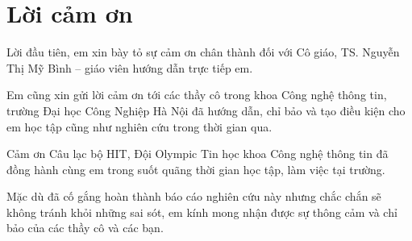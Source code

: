 \documentclass[envcountsame,envcountchap, openany, 14pt]{mysvmono2}
\begin{document}
\frontmatter%
\mainmatter%


\section*{\centering Lời cảm ơn}

Lời đầu tiên, em xin bày tỏ sự cảm ơn chân thành đối với Cô giáo, TS.
Nguyễn Thị Mỹ Bình – giáo viên hướng dẫn trực tiếp em.

Em cũng xin gửi lời cảm ơn tới các thầy cô trong khoa Công nghệ thông tin,
trường Đại học Công Nghiệp Hà Nội đã hướng dẫn, chỉ bảo và tạo điều kiện cho em
học tập cũng như nghiên cứu trong thời gian qua.

Cảm ơn Câu lạc bộ HIT, Đội Olympic Tin học khoa Công nghệ thông tin đã đồng hành
cùng em trong suốt quãng thời gian học tập, làm việc tại trường.

Mặc dù đã cố gắng hoàn thành báo cáo nghiên cứu này nhưng chắc chắn
sẽ không tránh khỏi những sai sót, em kính mong nhận được sự thông cảm và chỉ
bảo của các thầy cô và các bạn.

\tableofcontents







% 

\backmatter%
\medskip



\end{document}
